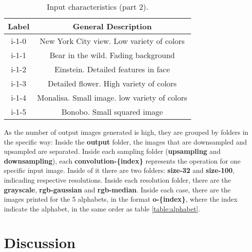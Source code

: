 \documentclass[]{IEEEtran}
\begin{document}
\begin{table}[H]
\centering
\begin{tabular}{ |c|c| } 
 \hline
 Label & General Description\\
 \hline
 i-1-0 & New York City view. Low variety of colors\\  
 \hline
 i-1-1 & Bear in the wild. Fading background\\
 \hline
 i-1-2 & Einstein. Detailed features in face \\
 \hline
 i-1-3 & Detailed flower. High variety of colors \\
 \hline
 i-1-4 & Monalisa. Small image. low variety of colors \\
 \hline
 i-1-5 & Bonobo. Small squared image \\
 \hline
\end{tabular}
 \label{table:inputs-2}
 \caption{Input characteristics (part 2).}
\end{table}


As the number of output images generated is high, they are grouped by folders in the specific way: Inside the \textbf{output} folder, the images that are downsampled and upsampled are separated. Inside each sampling folder (\textbf{upsampling} and \textbf{downsampling}), each \textbf{convolution-\{index\}} represents the operation for one specific input image. Inside of it there are two folders: \textbf{size-32} and \textbf{size-100}, indicading respective resolutions. Inside each resolution folder, there are the \textbf{grayscale}, \textbf{rgb-gaussian} and \textbf{rgb-median}. Inside each case, there are the images printed for the 5 alphabets, in the format \textbf{o-\{index\}}, where the index indicate the alphabet, in the same order as table \ref{table:alphabet}.  

\section{Discussion}
\end{document}

